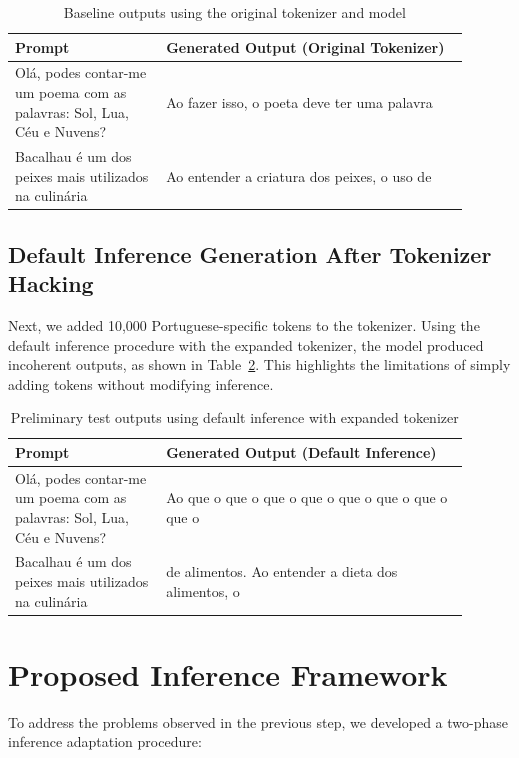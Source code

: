\begin{table}[H]
    \centering
    \begin{tabular}{|p{0.3\linewidth}|p{0.6\linewidth}|}
        \hline
        \textbf{Prompt} & \textbf{Generated Output (Original Tokenizer)} \\
        \hline
        Olá, podes contar-me um poema com as palavras: Sol, Lua, Céu e Nuvens? & Ao fazer isso, o poeta deve ter uma palavra \\
        \hline
        Bacalhau é um dos peixes mais utilizados na culinária & Ao entender a criatura dos peixes, o uso de \\
        \hline
    \end{tabular}
    \caption{Baseline outputs using the original tokenizer and model}
    \label{tab:default-baseline}
\end{table}

\subsection{Default Inference Generation After Tokenizer Hacking}
Next, we added 10,000 Portuguese-specific tokens to the tokenizer. Using the default inference procedure with the expanded tokenizer, the model produced incoherent outputs, as shown in Table~\ref{tab:default-inference-results}. This highlights the limitations of simply adding tokens without modifying inference.

\begin{table}[H]
    \centering
    \begin{tabular}{|p{0.3\linewidth}|p{0.6\linewidth}|}
        \hline
        \textbf{Prompt} & \textbf{Generated Output (Default Inference)} \\
        \hline
        Olá, podes contar-me um poema com as palavras: Sol, Lua, Céu e Nuvens? & Ao que o que o que o que o que o que o que o que o \\
        \hline
        Bacalhau é um dos peixes mais utilizados na culinária & de alimentos. Ao entender a dieta dos alimentos, o \\
        \hline
    \end{tabular}
    \caption{Preliminary test outputs using default inference with expanded tokenizer}
    \label{tab:default-inference-results}
\end{table}

\section{Proposed Inference Framework}
To address the problems observed in the previous step, we developed a two-phase inference adaptation procedure:

